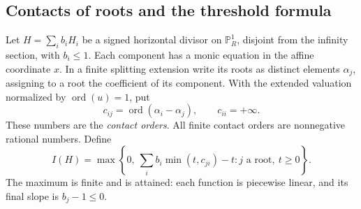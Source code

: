 \documentclass[11pt,reqno]{amsart}
\numberwithin{equation}{section}
\theoremstyle{definition}
\theoremstyle{remark}
\newcommand{\PP}{\mathbb P}
\newcommand{\ord}{\operatorname{ord}}
\begin{document}
\subsection{Contacts of roots and the threshold formula}
Let $H=\sum_i b_iH_i$ be a signed horizontal divisor on $\PP^1_R$, disjoint from the infinity section, with $b_i\le1$. Each component has a monic equation in the affine coordinate $x$. In a finite splitting extension write its roots as distinct elements $\alpha_j$, assigning to a root the coefficient of its component. With the extended valuation normalized by $\ord(u)=1$, put
\[
 c_{ij}=\ord(\alpha_i-\alpha_j),\qquad c_{ii}=+\infty.
\]
These numbers are the \emph{contact orders}. All finite contact orders are nonnegative rational numbers. Define
\begin{equation}\label{eq:contactI}
 I(H)=\max\left\{0,\ \sum_i b_i\min(t,c_{ji})-t:
 j\text{ a root},\ t\ge0\right\}.
\end{equation}
The maximum is finite and is attained: each function is piecewise linear, and its final slope is $b_j-1\le0$.
\end{document}
